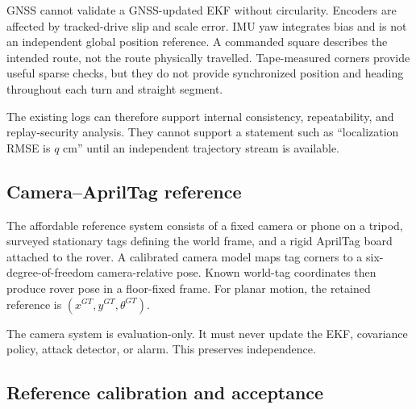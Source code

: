 \documentclass[11pt,a4paper]{article}
\begin{document}
GNSS cannot validate a GNSS-updated EKF without circularity. Encoders are
affected by tracked-drive slip and scale error. IMU yaw integrates bias and is
not an independent global position reference. A commanded square describes
the intended route, not the route physically travelled. Tape-measured corners
provide useful sparse checks, but they do not provide synchronized position and
heading throughout each turn and straight segment.

The existing logs can therefore support internal consistency, repeatability,
and replay-security analysis. They cannot support a statement such as
``localization RMSE is $q$ cm'' until an independent trajectory stream is
available.

\subsection{Camera--AprilTag reference}

The affordable reference system consists of a fixed camera or phone on a
tripod, surveyed stationary tags defining the world frame, and a rigid
AprilTag board attached to the rover. A calibrated camera model maps tag
corners to a six-degree-of-freedom camera-relative pose. Known world-tag
coordinates then produce rover pose in a floor-fixed frame. For planar motion,
the retained reference is $(x^{GT},y^{GT},\theta^{GT})$.

The camera system is evaluation-only. It must never update the EKF, covariance
policy, attack detector, or alarm. This preserves independence.

\subsection{Reference calibration and acceptance}
\end{document}
